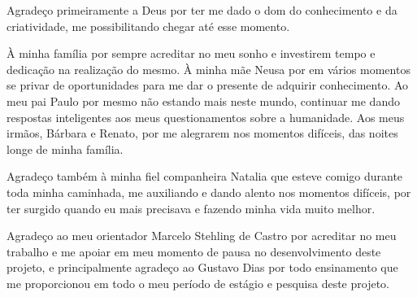 \begin{agradecimentos}

Agradeço primeiramente a Deus por ter me dado o dom do conhecimento e da criatividade, me possibilitando chegar até esse momento.

À minha família por sempre acreditar no meu sonho e investirem tempo e dedicação na realização do mesmo. À minha mãe Neusa por em vários momentos se privar de oportunidades para me dar o presente de adquirir conhecimento. Ao meu pai Paulo por mesmo não estando mais neste mundo, continuar me dando respostas inteligentes aos meus questionamentos sobre a humanidade. Aos meus irmãos, Bárbara e Renato, por me alegrarem nos momentos difíceis, das noites longe de minha família.

Agradeço também à minha fiel companheira Natalia que esteve comigo durante toda minha caminhada, me auxiliando e dando alento nos momentos difíceis, por ter surgido quando eu mais precisava e fazendo minha vida muito melhor.

Agradeço ao meu orientador Marcelo Stehling de Castro por acreditar no meu trabalho e me apoiar em meu momento de pausa no desenvolvimento deste projeto, e principalmente agradeço ao Gustavo Dias por todo ensinamento que me proporcionou em todo o meu período de estágio e pesquisa deste projeto.

\end{agradecimentos}